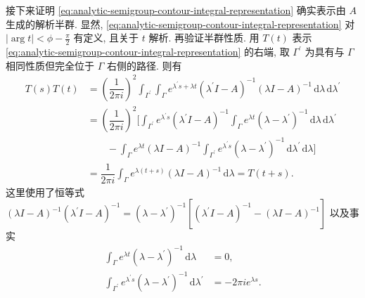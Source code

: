 接下来证明 \eqref{eq:analytic-semigroup-contour-integral-representation} 确实表示由 $A$ 生成的解析半群. 显然, \eqref{eq:analytic-semigroup-contour-integral-representation} 对 $|\arg t|<\phi-\frac{\pi}{2}$ 有定义, 且关于 $t$ 解析. 再验证半群性质. 用 $T(t)$ 表示 \eqref{eq:analytic-semigroup-contour-integral-representation} 的右端, 取 $\Gamma^{\prime}$ 为具有与 $\Gamma$ 相同性质但完全位于 $\Gamma$ 右侧的路径. 则有\[\begin{aligned}
T(s)T(t)&=\left(\dfrac{1}{2\pi i}\right)^2\int_{\Gamma^{\prime}}\int_\Gamma e^{\lambda^{\prime}s+\lambda t}(\lambda^{\prime}I-A)^{-1}(\lambda I-A)^{-1}\,\mathrm{d}\lambda\,\mathrm{d}\lambda^{\prime}\\
&=\left(\dfrac{1}{2\pi i}\right)^2\Bigg[\int_{\Gamma^{\prime}}e^{\lambda^{\prime}s}(\lambda^{\prime}I-A)^{-1}\int_\Gamma e^{\lambda t}(\lambda-\lambda^{\prime})^{-1}\,\mathrm{d}\lambda\,\mathrm{d}\lambda^{\prime}\\
&\qquad-\int_\Gamma e^{\lambda t}(\lambda I-A)^{-1}\int_{\Gamma^{\prime}}e^{\lambda^{\prime}s}(\lambda-\lambda^{\prime})^{-1}\,\mathrm{d}\lambda^{\prime}\,\mathrm{d}\lambda\Bigg]\\
&=\dfrac{1}{2\pi i}\int_\Gamma e^{\lambda(t+s)}(\lambda I-A)^{-1}\,\mathrm{d}\lambda=T(t+s).
\end{aligned}\]这里使用了恒等式 $(\lambda I-A)^{-1}(\lambda^{\prime}I-A)^{-1}=(\lambda-\lambda^{\prime})^{-1}[(\lambda^{\prime}I-A)^{-1}-(\lambda I-A)^{-1}]$ 以及事实\[\begin{aligned}
\int_\Gamma e^{\lambda t}(\lambda-\lambda^{\prime})^{-1}\,\mathrm{d}\lambda&=0,\\
\int_{\Gamma^{\prime}}e^{\lambda^{\prime}s}(\lambda-\lambda^{\prime})^{-1}\,\mathrm{d}\lambda^{\prime}&=-2\pi i e^{\lambda s}.
\end{aligned}\]

